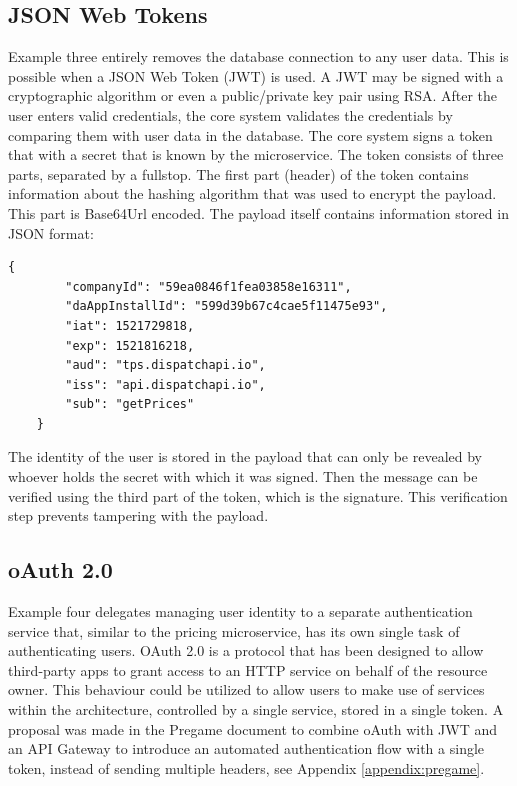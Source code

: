 \subsection{JSON Web Tokens}
Example three entirely removes the database connection to any user data. This is possible when a JSON Web Token (JWT) is used. A JWT may be signed with a cryptographic algorithm or even a public/private key pair using RSA. After the user enters valid credentials, the core system validates the credentials by comparing them with user data in the database. The core system signs a token that with a secret that is known by the microservice. The token consists of three parts, separated by a fullstop. The first part (header) of the token contains information about the hashing algorithm that was used to encrypt the payload. This part is Base64Url encoded. The payload itself contains information stored in JSON format:


\begin{center}
\end{center}


\begin{Verbatim}[fontsize=\scriptsize]
	{
		"companyId": "59ea0846f1fea03858e16311",
		"daAppInstallId": "599d39b67c4cae5f11475e93",
		"iat": 1521729818,
		"exp": 1521816218,
		"aud": "tps.dispatchapi.io",
		"iss": "api.dispatchapi.io",
		"sub": "getPrices"
	}
\end{Verbatim}

The identity of the user is stored in the payload that can only be revealed by whoever holds the secret with which it was signed. Then the message can be verified using the third part of the token, which is the signature. This verification step prevents tampering with the payload.

\subsection{oAuth 2.0}
Example four delegates managing user identity to a separate authentication service that, similar to the pricing microservice, has its own single task of authenticating users. OAuth 2.0 is a protocol that has been designed to allow third-party apps to grant access to an HTTP service on behalf of the resource owner. This behaviour could be utilized to allow users to make use of services within the architecture, controlled by a single service, stored in a single token. A proposal was made in the Pregame document to combine oAuth with JWT and an API Gateway to introduce an automated authentication flow with a single token, instead of sending multiple headers, see Appendix \ref{appendix:pregame}.

